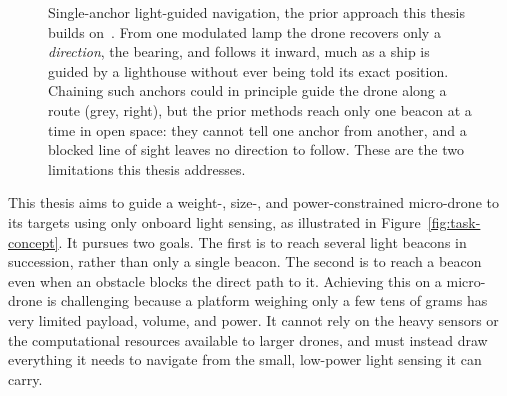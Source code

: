 \begin{figure}[ht]
    \centering
    \caption{Single-anchor light-guided navigation, the prior approach this thesis builds on~\cite{huang2026lta}. From one modulated lamp the drone recovers only a \emph{direction}, the bearing, and follows it inward, much as a ship is guided by a lighthouse without ever being told its exact position. Chaining such anchors could in principle guide the drone along a route (grey, right), but the prior methods reach only one beacon at a time in open space: they cannot tell one anchor from another, and a blocked line of sight leaves no direction to follow. These are the two limitations this thesis addresses.}
    \label{fig:single-anchor}
\end{figure}

This thesis aims to guide a weight-, size-, and power-constrained micro-drone to its targets using only onboard light sensing, as illustrated in Figure~\ref{fig:task-concept}. It pursues two goals. The first is to reach several light beacons in succession, rather than only a single beacon. The second is to reach a beacon even when an obstacle blocks the direct path to it. Achieving this on a micro-drone is challenging because a platform weighing only a few tens of grams has very limited payload, volume, and power. It cannot rely on the heavy sensors or the computational resources available to larger drones, and must instead draw everything it needs to navigate from the small, low-power light sensing it can carry.

